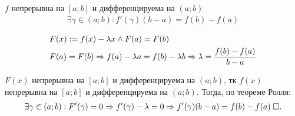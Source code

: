 \documentclass{article}
\begin{document}

\theorem

$f$ непрерывна на $[a;b]$ и дифференцируема на $(a;b)$
\begin{align*}
	\exists \gamma\in(a;b):f'(\gamma)(b-a)=f(b)-f(a)
\end{align*}

\proof
\begin{align*}
	 & F(x):=f(x)-\lambda x \land F(a)=F(b)                                             \\
	 & F(a)=F(b) \Rightarrow f(a)-\lambda a=f(b)-\lambda b\Rightarrow \lambda=\frac{f(b)-f(a)}{b-a}
\end{align*}

$F(x)$ непрерывна на $[a;b]$ и дифференцируема на $(a;b)$, тк $f(x)$ непрерывна на $[a;b]$ и дифференцируема на $(a;b)$. Тогда, по теореме Ролля:
\begin{align*}
	\exists\gamma\in(a;b):F'(\gamma)=0 \Rightarrow f'(\gamma)-\lambda=0\Rightarrow f'(\gamma)(b-a)=f(b)-f(a)\;\square.
\end{align*}
\end{document}
